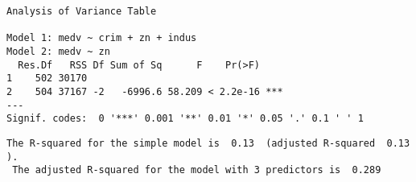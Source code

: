 \documentclass[
  letterpaper,
  DIV=11,
  numbers=noendperiod]{scrartcl}
\newenvironment{Shaded}{\begin{snugshade}}{\end{snugshade}}
\newcommand{\DecValTok}[1]{\textcolor[rgb]{0.68,0.00,0.00}{#1}}
\newcommand{\FunctionTok}[1]{\textcolor[rgb]{0.28,0.35,0.67}{#1}}
\newcommand{\NormalTok}[1]{\textcolor[rgb]{0.00,0.23,0.31}{#1}}
\newcommand{\SpecialCharTok}[1]{\textcolor[rgb]{0.37,0.37,0.37}{#1}}
\newcommand{\StringTok}[1]{\textcolor[rgb]{0.13,0.47,0.30}{#1}}
\begin{document}
\begin{verbatim}
Analysis of Variance Table

Model 1: medv ~ crim + zn + indus
Model 2: medv ~ zn
  Res.Df   RSS Df Sum of Sq      F    Pr(>F)    
1    502 30170                                  
2    504 37167 -2   -6996.6 58.209 < 2.2e-16 ***
---
Signif. codes:  0 '***' 0.001 '**' 0.01 '*' 0.05 '.' 0.1 ' ' 1
\end{verbatim}

\begin{Shaded}
\end{Shaded}

\begin{verbatim}
The R-squared for the simple model is  0.13  (adjusted R-squared  0.13 ).
 The adjusted R-squared for the model with 3 predictors is  0.289
\end{verbatim}

\begin{verbatim}
\end{verbatim}
\end{document}
